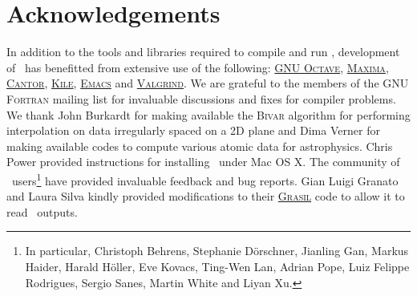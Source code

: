 \chapter{Acknowledgements}

In addition to the tools and libraries required to compile and run \glc, development of \glc\ has benefitted from extensive use of the following: \href{http://www.gnu.org/software/octave/}{{\normalfont \scshape GNU Octave}}, \href{http://maxima.sourceforge.net/}{{\normalfont \scshape Maxima}}, \href{http://edu.kde.org/cantor/}{{\normalfont \scshape Cantor}}, \href{http://kile.sourceforge.net/}{{\normalfont \scshape Kile}}, \href{http://www.gnu.org/software/emacs/}{{\normalfont \scshape Emacs}} and \href{http://valgrind.org/}{{\normalfont \scshape Valgrind}}. We are grateful to the members of the {\normalfont \scshape GNU Fortran} mailing list for invaluable discussions and fixes for compiler problems. We thank John Burkardt for making available the {\normalfont \scshape Bivar} algorithm for performing interpolation on data irregularly spaced on a 2D plane and Dima Verner for making available codes to compute various atomic data for astrophysics. Chris Power provided instructions for installing \glc\ under Mac OS X. The community of \glc\ users\footnote{In particular, Christoph Behrens, Stephanie D\"orschner, Jianling Gan, Markus Haider, Harald H\"oller, Eve Kovacs, Ting-Wen Lan, Adrian Pope, Luiz Felippe Rodrigues, Sergio Sanes, Martin White and Liyan Xu.} have provided invaluable feedback and bug reports. Gian Luigi Granato and Laura Silva kindly provided modifications to their \href{http://adlibitum.oat.ts.astro.it/silva/grasil/grasil.html}{\normalfont \scshape Grasil} code to allow it to read \glc\ outputs.
